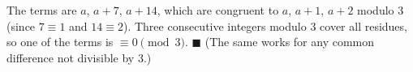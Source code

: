 The terms are $a$, $a+7$, $a+14$, which are congruent to $a$, $a+1$, $a+2$ modulo $3$ (since $7\equiv1$ and $14\equiv2$). Three consecutive integers modulo $3$ cover all residues, so one of the terms is $\equiv0\pmod3$. $\blacksquare$ (The same works for any common difference not divisible by $3$.)
